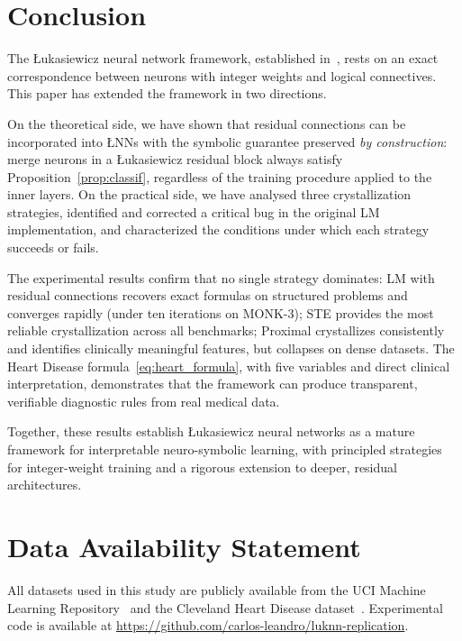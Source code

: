 \documentclass[12pt,a4paper]{article}
\newcommand{\LNN}{\L{}NN}
\begin{document}
\section{Conclusion}
\label{sec:conclusion}

The \L{}ukasiewicz neural network framework, established in~\cite{leandro2009},
rests on an exact correspondence between neurons with integer weights and
logical connectives.
This paper has extended the framework in two directions.

On the theoretical side, we have shown that residual connections can be
incorporated into \LNN{}s with the symbolic guarantee preserved
\emph{by construction}: merge neurons in a \L{}ukasiewicz residual block
always satisfy Proposition~\ref{prop:classif}, regardless of the training
procedure applied to the inner layers.
On the practical side, we have analysed three crystallization strategies,
identified and corrected a critical bug in the original LM implementation,
and characterized the conditions under which each strategy succeeds or fails.

The experimental results confirm that no single strategy dominates: LM with
residual connections recovers exact formulas on structured problems and
converges rapidly (under ten iterations on MONK-3); STE provides the most
reliable crystallization across all benchmarks; Proximal crystallizes
consistently and identifies clinically meaningful features, but collapses
on dense datasets.
The Heart Disease formula~\eqref{eq:heart_formula}, with five variables and
direct clinical interpretation, demonstrates that the framework can produce
transparent, verifiable diagnostic rules from real medical data.

Together, these results establish \L{}ukasiewicz neural networks as a mature
framework for interpretable neuro-symbolic learning, with principled
strategies for integer-weight training and a rigorous extension to deeper,
residual architectures.

\section*{Data Availability Statement}

All datasets used in this study are publicly available from the UCI Machine
Learning Repository~\cite{uci2017} and the Cleveland Heart Disease
dataset~\cite{detrano1989}.
Experimental code is available at
\url{https://github.com/carlos-leandro/luknn-replication}.
\end{document}
